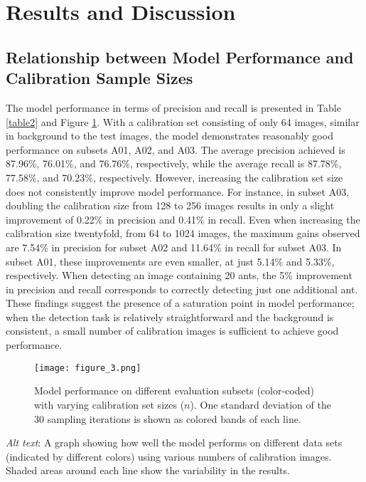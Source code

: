 \section{Results and Discussion}

\subsection{Relationship between Model Performance and Calibration Sample Sizes}

The model performance in terms of precision and recall is presented in Table \ref{table2} and Figure \ref{fig:figure3}. With a calibration set consisting of only 64 images, similar in background to the test images, the model demonstrates reasonably good performance on subsets A01, A02, and A03. The average precision achieved is 87.96\%, 76.01\%, and 76.76\%, respectively, while the average recall is 87.78\%, 77.58\%, and 70.23\%, respectively. However, increasing the calibration set size does not consistently improve model performance. For instance, in subset A03, doubling the calibration size from 128 to 256 images results in only a slight improvement of 0.22\% in precision and 0.41\% in recall. Even when increasing the calibration size twentyfold, from 64 to 1024 images, the maximum gains observed are 7.54\% in precision for subset A02 and 11.64\% in recall for subset A03. In subset A01, these improvements are even smaller, at just 5.14\% and 5.33\%, respectively. When detecting an image containing 20 ants, the 5\% improvement in precision and recall corresponds to correctly detecting just one additional ant. These findings suggest the presence of a saturation point in model performance; when the detection task is relatively straightforward and the background is consistent, a small number of calibration images is sufficient to achieve good performance.

\begin{figure}[H]
    \centering
    \texttt{[image: figure\_3.png]}
    \caption{Model performance on different evaluation subsets (color-coded) with varying calibration set sizes ($n$). One standard deviation of the 30 sampling iterations is shown as colored bands of each line.}
    \label{fig:figure3}
\end{figure}

\textit{Alt text}: A graph showing how well the model performs on different data sets (indicated by different colors) using various numbers of calibration images. Shaded areas around each line show the variability in the results.

